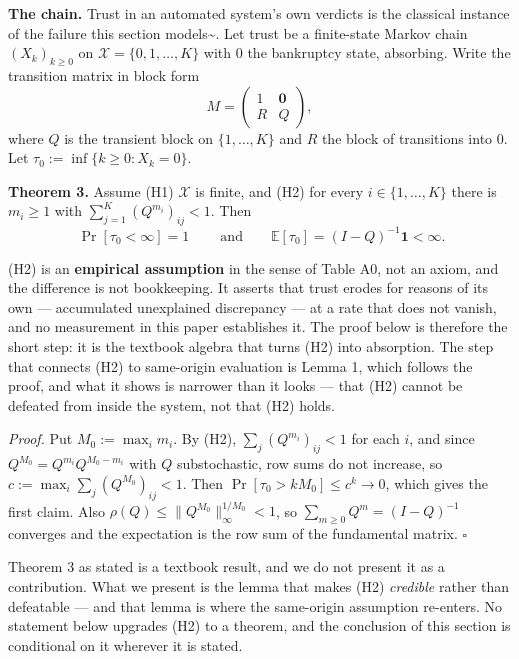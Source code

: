 \documentclass[11pt,a4paper]{article}
\begin{document}
\textbf{The chain.} Trust in an automated system's own verdicts is the classical
instance of the failure this section models\textasciitilde{}\cite{parasuraman1997humans}. Let
trust be a finite-state Markov chain \((X_k)_{k\ge0}\) on
\(\mathcal X=\{0,1,\dots,K\}\) with \(0\) the bankruptcy state, absorbing. Write the transition matrix in block form
\begin{equation}
M=\begin{pmatrix} 1 & \mathbf 0\\ R & Q\end{pmatrix},
\tag{2.9.1}
\end{equation}
where \(Q\) is the transient block on \(\{1,\dots,K\}\) and \(R\) the block of
transitions into \(0\). Let \(\tau_0:=\inf\{k\ge0:X_k=0\}\).

\textbf{Theorem 3.} Assume (H1) \(\mathcal X\) is finite, and (H2) for every
\(i\in\{1,\dots,K\}\) there is \(m_i\ge1\) with
\(\sum_{j=1}^{K}(Q^{m_i})_{ij}<1\). Then
\begin{equation}
\boxed{\ \Pr[\tau_0<\infty]=1\ }
\qquad\text{and}\qquad
\mathbb E[\tau_0]=(I-Q)^{-1}\mathbf 1<\infty .
\tag{2.9.2}
\end{equation}

(H2) is an \textbf{empirical assumption} in the sense of Table A0, not an axiom, and the
difference is not bookkeeping. It asserts that trust erodes for reasons of its own ---
accumulated unexplained discrepancy --- at a rate that does not vanish, and no
measurement in this paper establishes it. The proof below is therefore the short
step: it is the textbook algebra that turns (H2) into absorption. The step that
connects (H2) to same-origin evaluation is Lemma 1, which follows the proof, and
what it shows is narrower than it looks --- that (H2) cannot be defeated from inside
the system, not that (H2) holds.

\emph{Proof.} Put \(M_0:=\max_i m_i\). By (H2), \(\sum_j(Q^{m_i})_{ij}<1\) for each \(i\), and
since \(Q^{M_0}=Q^{m_i}Q^{M_0-m_i}\) with \(Q\) substochastic, row sums do not
increase, so \(c:=\max_i\sum_j(Q^{M_0})_{ij}<1\). Then
\(\Pr[\tau_0>kM_0]\le c^{k}\to0\), which gives the first claim. Also
\(\rho(Q)\le\|Q^{M_0}\|^{1/M_0}_\infty<1\), so \(\sum_{m\ge0}Q^m=(I-Q)^{-1}\)
converges and the expectation is the row sum of the fundamental matrix. \(\square\)

Theorem 3 as stated is a textbook result, and we do not present it as a
contribution. What we present is the lemma that makes (H2) \emph{credible} rather than
defeatable --- and that lemma is where the same-origin assumption re-enters. No
statement below upgrades (H2) to a theorem, and the conclusion of this section is
conditional on it wherever it is stated.
\end{document}
